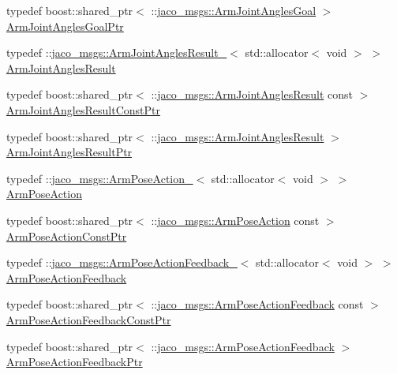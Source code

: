 \begin{DoxyCompactItemize}
\item 
typedef boost\+::shared\+\_\+ptr$<$ \+::\hyperlink{namespacejaco__msgs_a5ae3531b112ac4b78145e9ab10e9a8fa}{jaco\+\_\+msgs\+::\+Arm\+Joint\+Angles\+Goal} $>$ \hyperlink{namespacejaco__msgs_a2bf27c120c452214bdb882f04e4197cf}{Arm\+Joint\+Angles\+Goal\+Ptr}
\item 
typedef \+::\hyperlink{structjaco__msgs_1_1ArmJointAnglesResult__}{jaco\+\_\+msgs\+::\+Arm\+Joint\+Angles\+Result\+\_\+}$<$ std\+::allocator$<$ void $>$ $>$ \hyperlink{namespacejaco__msgs_a162d07c0197060599e2b1173b15c683d}{Arm\+Joint\+Angles\+Result}
\item 
typedef boost\+::shared\+\_\+ptr$<$ \+::\hyperlink{namespacejaco__msgs_a162d07c0197060599e2b1173b15c683d}{jaco\+\_\+msgs\+::\+Arm\+Joint\+Angles\+Result} const  $>$ \hyperlink{namespacejaco__msgs_a6b7a7c048f53348e4241da395f67c057}{Arm\+Joint\+Angles\+Result\+Const\+Ptr}
\item 
typedef boost\+::shared\+\_\+ptr$<$ \+::\hyperlink{namespacejaco__msgs_a162d07c0197060599e2b1173b15c683d}{jaco\+\_\+msgs\+::\+Arm\+Joint\+Angles\+Result} $>$ \hyperlink{namespacejaco__msgs_a6de532983ecb41c3ff4b7f2b16c5727d}{Arm\+Joint\+Angles\+Result\+Ptr}
\item 
typedef \+::\hyperlink{structjaco__msgs_1_1ArmPoseAction__}{jaco\+\_\+msgs\+::\+Arm\+Pose\+Action\+\_\+}$<$ std\+::allocator$<$ void $>$ $>$ \hyperlink{namespacejaco__msgs_a4c602e87a73fa73e367226c6d5547ebd}{Arm\+Pose\+Action}
\item 
typedef boost\+::shared\+\_\+ptr$<$ \+::\hyperlink{namespacejaco__msgs_a4c602e87a73fa73e367226c6d5547ebd}{jaco\+\_\+msgs\+::\+Arm\+Pose\+Action} const  $>$ \hyperlink{namespacejaco__msgs_a7464e86fd856f667e5242d2466cb9262}{Arm\+Pose\+Action\+Const\+Ptr}
\item 
typedef \+::\hyperlink{structjaco__msgs_1_1ArmPoseActionFeedback__}{jaco\+\_\+msgs\+::\+Arm\+Pose\+Action\+Feedback\+\_\+}$<$ std\+::allocator$<$ void $>$ $>$ \hyperlink{namespacejaco__msgs_a6f6f1bdac87560a87a57138102dbbf6e}{Arm\+Pose\+Action\+Feedback}
\item 
typedef boost\+::shared\+\_\+ptr$<$ \+::\hyperlink{namespacejaco__msgs_a6f6f1bdac87560a87a57138102dbbf6e}{jaco\+\_\+msgs\+::\+Arm\+Pose\+Action\+Feedback} const  $>$ \hyperlink{namespacejaco__msgs_a92dec13890096ba598d4d0c136574964}{Arm\+Pose\+Action\+Feedback\+Const\+Ptr}
\item 
typedef boost\+::shared\+\_\+ptr$<$ \+::\hyperlink{namespacejaco__msgs_a6f6f1bdac87560a87a57138102dbbf6e}{jaco\+\_\+msgs\+::\+Arm\+Pose\+Action\+Feedback} $>$ \hyperlink{namespacejaco__msgs_ae614cc05e0e370e568aa40d6ffd15ea5}{Arm\+Pose\+Action\+Feedback\+Ptr}

\end{DoxyCompactItemize}
